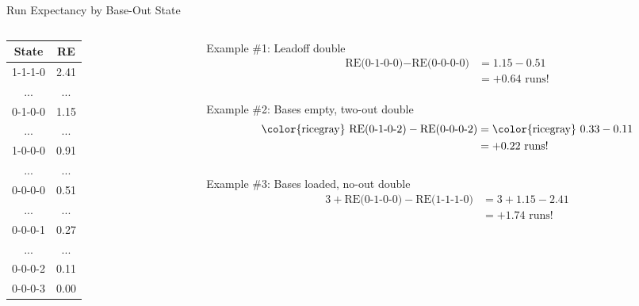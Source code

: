 \documentclass[handout]{beamer}
\begin{document}
\begin{frame}{Run Expectancy by Base-Out State}
  \begin{columns}
    \begin{column}{0.3\textwidth}
      \centering
      \begin{tabular}{c|c}
        State   & RE\\
        \hline
        1-1-1-0 & 2.41\\
        ... & ...\\
        0-1-0-0 & 1.15\\
        ... & ...\\
        1-0-0-0 & 0.91\\
        ... & ...\\
        0-0-0-0 & 0.51\\
        ... & ...\\
        0-0-0-1 & 0.27\\
        ... & ...\\
        0-0-0-2 & 0.11\\
        0-0-0-3 & 0.00\\
      \end{tabular}
    \end{column}
    \begin{column}{0.7\textwidth}
      \footnotesize
      \pause
      Example \#1: Leadoff double
      \begin{align*}
        \mbox{RE(0-1-0-0)} - \mbox{RE(0-0-0-0)} &= 1.15 - 0.51\\
                                                &= +0.64 \mbox{ runs!}
      \end{align*}
      ~\\
      \pause
      Example \#2: Bases empty, two-out double
      \begin{align*}
        \mbox{\color{ricegray} RE(0-1-0-2)} - \mbox{RE(0-0-0-2)} &= \mbox{\color{ricegray} 0.33} - 0.11\\
                                                                 &= +0.22 \mbox{ runs!}
      \end{align*}
      ~\\
      \pause
      Example \#3: Bases loaded, no-out double
      \begin{align*}
        3 + \mbox{RE(0-1-0-0)} - \mbox{RE(1-1-1-0)} &= 3 + 1.15 - 2.41\\
                                                    &= +1.74 \mbox{ runs!}
      \end{align*}
    \end{column}
  \end{columns}
\end{frame}
\end{document}
